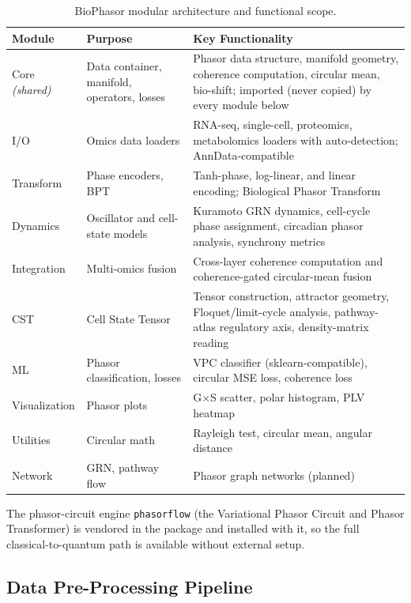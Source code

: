 \documentclass[preprint,12pt,amsmath,amssymb,superscriptaddress,floatfix]{revtex4-2}
\begin{document}
\begin{table}[h]
\centering
\caption{BioPhasor modular architecture and functional scope.}
\label{tab:architecture}
\begin{tabular}{p{3.2cm}p{5.0cm}p{5.2cm}}
\toprule
\textbf{Module} & \textbf{Purpose} & \textbf{Key Functionality} \\
\midrule
Core \emph{(shared)} & Data container, manifold, operators, losses &
  Phasor data structure, manifold geometry, coherence
  computation, circular mean, bio-shift; imported (never copied)
  by every module below \\[4pt]
I/O & Omics data loaders &
  RNA-seq, single-cell, proteomics, metabolomics
  loaders with auto-detection; AnnData-compatible \\[4pt]
Transform & Phase encoders, BPT &
  Tanh-phase, log-linear, and linear encoding;
  Biological Phasor Transform \\[4pt]
Dynamics & Oscillator and cell-state models &
  Kuramoto GRN dynamics, cell-cycle phase assignment,
  circadian phasor analysis, synchrony metrics \\[4pt]
Integration & Multi-omics fusion &
  Cross-layer coherence computation and
  coherence-gated circular-mean fusion \\[4pt]
CST & Cell State Tensor &
  Tensor construction, attractor geometry, Floquet/limit-cycle
  analysis, pathway-atlas regulatory axis, density-matrix reading \\[4pt]
ML & Phasor classification, losses &
  VPC classifier (sklearn-compatible), circular MSE loss,
  coherence loss \\[4pt]
Visualization & Phasor plots &
  G$\times$S scatter, polar histogram, PLV heatmap \\[4pt]
Utilities & Circular math &
  Rayleigh test, circular mean,
  angular distance \\[4pt]
Network & GRN, pathway flow &
  Phasor graph networks (planned) \\
\bottomrule
\end{tabular}
\end{table}

The phasor-circuit engine \texttt{phasorflow} (the Variational Phasor Circuit and
Phasor Transformer) is vendored in the package and installed with it, so the full
classical-to-quantum path is available without external setup.

\subsection{Data Pre-Processing Pipeline}
\label{subsec:data}
\end{document}
